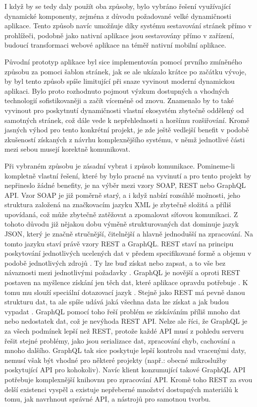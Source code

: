 	I když by se tedy daly použít oba způsoby, bylo vybráno řešení využívající dynamické komponenty,
	zejména z důvodu požadované velké dynamičnosti aplikace.
	Tento způsob navíc umožňuje díky systému sestavování stránek přímo v prohlížeči, podobně jako nativní aplikace jsou
	sestavovány přímo v zařízení, budoucí transformaci webové aplikace na téměř nativní mobilní aplikace.

	Původní prototyp aplikace byl sice implementován pomocí prvního zmíněného způsobu za pomoci šablon stránek, jak se
	ale ukázalo krátce po začátku vývoje, by byl tento způsob spíše limitující při snaze vyvinout moderní dynamickou aplikaci.
	Bylo proto rozhodnuto pojmout výzkum dostupných a vhodných technologií sofistikovaněji a začít víceméně od znovu.
	Znamenalo by to také vyvinout pro poskytnutí dynamičnosti vlastní ekosystém zbytečně oddělený od samotných stránek,
	což dále vede k nepřehlednosti a horšímu rozšiřování.
	Kromě jasných výhod pro tento konkrétní projekt, je zde ještě vedlejší benefit v podobě zkušeností získaných
	z návrhu komplexnějšího systému, v němž jednotlivé části mezi sebou musejí korektně komunikovat.

	Při vybraném způsobu je zásadní vybrat i způsob komunikace.
	Pomineme-li kompletně vlastní řešení, které by bylo pracné na vyvinutí a pro tento projekt by nepřineslo žádné benefity,
	je na výběr mezi vzory \ac{SOAP}, \ac{REST} nebo GraphQL \ac{API}.
	Vzor \ac{SOAP} je již poměrně starý, a i když nabízí rozsáhlé možnosti, jeho struktura založená na značkovacím jazyku
	\ac{XML} je zbytečně složitá a příliš upovídaná, což může zbytečně zatěžovat a zpomalovat
	síťovou komunikaci.
	Z tohoto důvodu již nějakou dobu výměně strukturovaných dat dominuje jazyk \ac{JSON}, který je značně stručnější,
	čitelnější a hlavně jednodušší na zpracování.
	Na tomto jazyku staví právě vzory \ac{REST} a GraphQL.
	\ac{REST} staví na principu poskytování jednotlivých ucelených dat v předem specifikované formě a objemu v
	podobě jednotlivých zdrojů \cite{restfulapi}.
	Ty lze buď získat nebo zapsat, a to vše bez návaznosti mezi jednotlivými požadavky
	\cite{restfulapi}.
	GraphQL je novější a oproti \ac{REST} postaven na myšlence získání jen těch dat, které aplikace opravdu potřebuje \cite{graphql}.
	K tomu mu slouží speciální dotazovací jazyk \cite{graphql}.
	Stejně jako \ac{REST} má pevně danou strukturu dat, ta ale spíše udává jaká všechna data lze získat a jak budou vypadat \cite{graphql}.
	GraphQL pomocí toho řeší problém se získáváním příliš mnoho dat nebo nedostatek dat, což je nevýhoda \ac{REST} \ac{API}.
	Nelze ale říci, že GraphQL je za všech podmínek lepší než \ac{REST}, protože každé \ac{API} musí z pohledu serveru
	řešit stejné problémy, jako jsou serializace dat, zpracování chyb, cachování a mnoho dalšího.
	GraphQL tak sice poskytuje lepší kontrolu nad vracenými daty, nemusí však být vhodné pro některé projekty (např.:
	obecné mikroslužby poskytující \ac{API} pro kohokoliv).
	Navíc klient konzumující takové GraphQL \ac{API} potřebuje
	komplexnější knihovnu pro zpracování \ac{API}.
	Kromě toho \ac{REST} za svou delší existenci vyspěl a existuje nepřeberné množství dostupných materiálů k tomu, jak navrhnout
	správné \ac{API}, a nástrojů pro samotnou tvorbu.

